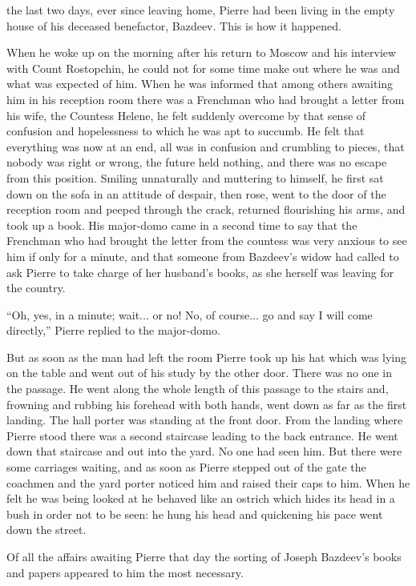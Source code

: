  the last two days, ever since leaving home, Pierre had been
living in the empty house of his deceased benefactor,
Bazdeev. This is how it happened.

When he woke up on the morning after his return to Moscow and his
interview with Count Rostopchin, he could not for some time make
out where he was and what was expected of him. When he was
informed that among others awaiting him in his reception room
there was a Frenchman who had brought a letter from his wife, the
Countess Helene, he felt suddenly overcome by that sense of
confusion and hopelessness to which he was apt to succumb. He
felt that everything was now at an end, all was in confusion and
crumbling to pieces, that nobody was right or wrong, the future
held nothing, and there was no escape from this position. Smiling
unnaturally and muttering to himself, he first sat down on the
sofa in an attitude of despair, then rose, went to the door of
the reception room and peeped through the crack, returned
flourishing his arms, and took up a book. His major-domo came in
a second time to say that the Frenchman who had brought the
letter from the countess was very anxious to see him if only for
a minute, and that someone from Bazdeev's widow had called to ask
Pierre to take charge of her husband's books, as she herself was
leaving for the country.

``Oh, yes, in a minute; wait... or no! No, of course... go and
say I will come directly,'' Pierre replied to the major-domo.

But as soon as the man had left the room Pierre took up his hat
which was lying on the table and went out of his study by the
other door.  There was no one in the passage. He went along the
whole length of this passage to the stairs and, frowning and
rubbing his forehead with both hands, went down as far as the
first landing. The hall porter was standing at the front
door. From the landing where Pierre stood there was a second
staircase leading to the back entrance. He went down that
staircase and out into the yard. No one had seen him. But there
were some carriages waiting, and as soon as Pierre stepped out of
the gate the coachmen and the yard porter noticed him and raised
their caps to him. When he felt he was being looked at he behaved
like an ostrich which hides its head in a bush in order not to be
seen: he hung his head and quickening his pace went down the
street.

Of all the affairs awaiting Pierre that day the sorting of Joseph
Bazdeev's books and papers appeared to him the most necessary.

